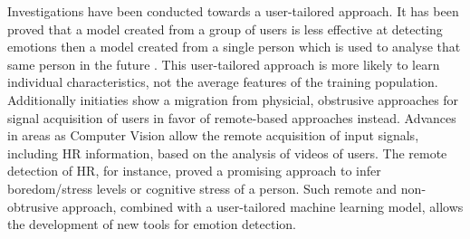 Investigations have been conducted towards a user-tailored approach. It has been proved that a model created from a group of users is less effective at detecting emotions then a model created from a single person which is used to analyse that same person in the future \parencite{bailenson2008real}. This user-tailored approach is more likely to learn individual characteristics, not the average features of the training population. Additionally initiaties show a migration from physicial, obstrusive approaches for signal acquisition of users in favor of remote-based approaches instead. Advances in areas as Computer Vision allow the remote acquisition of input signals, including HR information, based on the analysis of videos of users. The remote detection of HR, for instance, proved a promising approach to infer boredom/stress levels \parencite{kukolja2014comparative} or cognitive stress \parencite{mcduff2014remote} of a person. Such remote and non-obtrusive approach, combined with a user-tailored machine learning model, allows the development of new tools for emotion detection.

